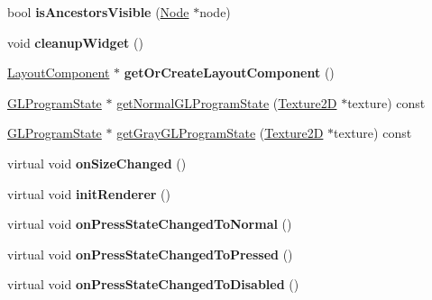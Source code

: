 \begin{DoxyCompactItemize}
\item 
\mbox{\label{classui_1_1Widget_ab5f99faeef30f00173bb6cb619870a6c}} 
bool {\bfseries is\+Ancestors\+Visible} (\hyperlink{classNode}{Node} $\ast$node)
\item 
\mbox{\label{classui_1_1Widget_a214b524c319c09fe65fd070334052b89}} 
void {\bfseries cleanup\+Widget} ()
\item 
\mbox{\label{classui_1_1Widget_a23bbfb8e7bed21cb8f458bd871c72ba1}} 
\hyperlink{classui_1_1LayoutComponent}{Layout\+Component} $\ast$ {\bfseries get\+Or\+Create\+Layout\+Component} ()
\item 
\hyperlink{classGLProgramState}{G\+L\+Program\+State} $\ast$ \hyperlink{classui_1_1Widget_a9b1c9831f5e0e869272fb51eddd1c06a}{get\+Normal\+G\+L\+Program\+State} (\hyperlink{classTexture2D}{Texture2D} $\ast$texture) const
\item 
\hyperlink{classGLProgramState}{G\+L\+Program\+State} $\ast$ \hyperlink{classui_1_1Widget_a4952ecf1e38d3a3c7c1aa78e1a07f4ec}{get\+Gray\+G\+L\+Program\+State} (\hyperlink{classTexture2D}{Texture2D} $\ast$texture) const
\item 
\mbox{\label{classui_1_1Widget_a2c9da3687ffa90416158055a115a148e}} 
virtual void {\bfseries on\+Size\+Changed} ()
\item 
\mbox{\label{classui_1_1Widget_a2937c96489a8eec6d47a95a791534b3c}} 
virtual void {\bfseries init\+Renderer} ()
\item 
\mbox{\label{classui_1_1Widget_a96efe794879a5e0170ef616d09d700da}} 
virtual void {\bfseries on\+Press\+State\+Changed\+To\+Normal} ()
\item 
\mbox{\label{classui_1_1Widget_a1e8a99c8f3fc40d7590d712f0ff8e42c}} 
virtual void {\bfseries on\+Press\+State\+Changed\+To\+Pressed} ()
\item 
\mbox{\label{classui_1_1Widget_a0e1c6cb29cea7aa18208c1a841a743df}} 
virtual void {\bfseries on\+Press\+State\+Changed\+To\+Disabled} ()
\item 
\mbox{\label{classui_1_1Widget_a3bffd2be03976f329aafa4d0bae9adb6}} 

\end{DoxyCompactItemize}
